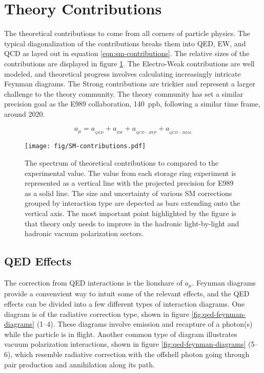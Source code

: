 \section{Theory Contributions} \label{sec:theory}

The theoretical contributions to \mugmtwo come from all corners of particle physics.  The typical diagonalization of the contributions breaks them into QED, EW, and QCD as layed out in equation \ref{eqn:sm-contributions}. The relative sizes of the contributions are displayed in figure \ref{fig:sm-contributions}. The Electro-Weak contributions are well modeled, and theoretical progress involves calculating increasingly intricate Feynman diagrams.  The Strong contributions are trickier and represent a larger challenge to the theory community.  The theory community has set a similar precision goal as the E989 collaboration, \SI{140}{ppb}, following a similar time frame, around 2020\cite{e989-tdr}.

\begin{equation}
\label{eqn:sm-contributions}
a_\mu = a_{_{QED}} + a_{_{EW}} + a_{_{QCD-HVP}} + a_{_{QCD-HLbL}}
\end{equation}

\begin{figure}
\label{fig:sm-contributions}
\centering
\texttt{[image: fig/SM-contributions.pdf]}
\caption{The spectrum of theoretical contributions to \mugmtwo compared to the experimental value.  The value from each storage ring experiment is represented as a vertical line with the projected precision for E989 as a solid line.  The size and uncertainty of various SM corrections grouped by interaction type are depected as bars extending onto the vertical axis. The most important point highlighted by the figure is that theory only needs to improve in the hadronic light-by-light and hadronic vacuum polarization sectors.}
\end{figure}

\subsection{QED Effects} \label{s-sec:theory-qed}

The correction from QED interactions is the lionshare of $a_\mu$.  Feynman diagrams provide a convenvient way to intuit some of the relevant effects, and the QED effects can be divided into a few different types of interaction diagrams.  One diagram is of the radiative correction type, shown in figure \ref{fig:qed-feynman-diagrams} (1\hbox{--}4).  These diagrams involve emission and recapture of a photon(s) while the particle is in flight.  Another common type of diagram illustrates vacuum polarization interactions, shown in figure \ref{fig:qed-feynman-diagrams} (5\hbox{--}6), which resemble radiative correction with the offshell photon going through pair production and annihilation along its path.

